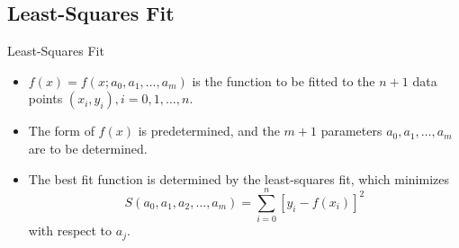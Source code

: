 \documentclass{beamer}
\begin{document}
\subsection[Least-Squares Fit]{Least-Squares Fit}
\begin{frame}{Least-Squares Fit}
\begin{itemize}
\item  $f(x)=f(x;a_0,a_1,\ldots,a_m)$ is the function to be fitted to the $n+1$ data points $(x_i,y_i),i=0,1,\ldots,n$.
\item The form of $f(x)$ is predetermined, and the  $m+1$ parameters $a_0, a_1, \ldots, a_m$ are to be determined.
\item The best fit function is determined by the \alert{least-squares} fit, which minimizes
\[
S(a_0, a_1, a_2, \ldots, a_m) =\sum_{i=0}^n[y_i-f(x_i)]^2
\]
with respect to $a_j$. 
\end{itemize}
\end{frame}
\end{document}
